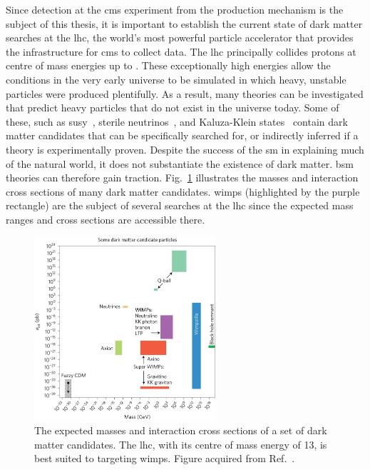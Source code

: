 Since detection at the \acrshort{cms} experiment from the production mechanism is the subject of this thesis, it is important to establish the current state of dark matter searches at the \acrshort{lhc}, the world's most powerful particle accelerator that provides the infrastructure for \acrshort{cms} to collect data. The \acrshort{lhc} principally collides protons at centre of mass energies up to \comruntwo. These exceptionally high energies allow the conditions in the very early universe to be simulated in which heavy, unstable particles were produced plentifully. As a result, many theories can be investigated that predict heavy particles that do not exist in the universe today. Some of these, such as \acrshort{susy}~\cite{Martin:1997ns}, sterile neutrinos~\cite{doi:10.1142/S0218301313300191}, and Kaluza-Klein states~\cite{Han:1998sg} contain dark matter candidates that can be specifically searched for, or indirectly inferred if a theory is experimentally proven. Despite the success of the \acrlong{sm} in explaining much of the natural world, it does not substantiate the existence of dark matter. \acrshort{bsm} theories can therefore gain traction. Fig.~\ref{fig:dm_masses_xsecs} illustrates the masses and interaction cross sections of many dark matter candidates. \acrshort{wimp}s (highlighted by the purple rectangle) are the subject of several searches at the \acrshort{lhc} since the expected mass ranges and cross sections are accessible there.

\begin{figure}[htbp]
    \centering
    \includegraphics[width=0.6\textwidth]{figures/dm_masses_xsecs.jpg}
    \caption[The expected masses and interaction cross sections of a set of dark matter candidates]{The expected masses and interaction cross sections of a set of dark matter candidates. The \acrshort{lhc}, with its centre of mass energy of 13\TeV, is best suited to targeting \glspl{wimp}. Figure acquired from Ref.~.}
    \label{fig:dm_masses_xsecs}
\end{figure}


